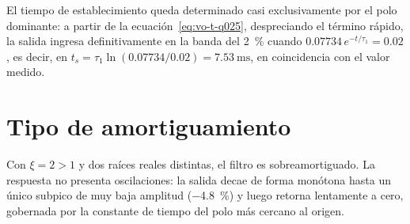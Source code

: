 El tiempo de establecimiento queda determinado casi exclusivamente por el polo dominante: a partir de la
ecuación~\eqref{eq:vo-t-q025}, despreciando el término rápido, la salida ingresa definitivamente en la
banda del \qty{2}{\percent} cuando $\num{0.07734}\, e^{-t/\tau_1} = \num{0.02}$, es decir, en
$t_s = \tau_1 \ln\left(\num{0.07734}/\num{0.02}\right) = \qty{7.53}{\milli\second}$, en coincidencia con el
valor medido.

\section{Tipo de amortiguamiento}

Con $\xi = 2 > 1$ y dos raíces reales distintas, el filtro es sobreamortiguado. La respuesta no presenta
oscilaciones: la salida decae de forma monótona hasta un único subpico de muy baja amplitud
(\qty{-4.8}{\percent}) y luego retorna lentamente a cero, gobernada por la constante de tiempo del polo
más cercano al origen.
